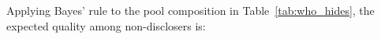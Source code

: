 Applying Bayes' rule to the pool composition in Table~\ref{tab:who_hides}, the expected quality among non-disclosers is:
